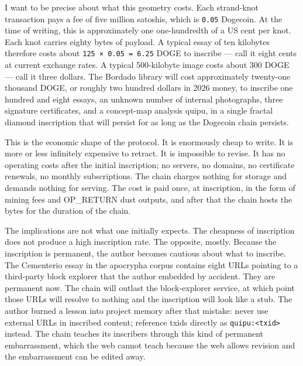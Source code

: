 \documentclass[11pt,openany]{book}
\begin{document}
I want to be precise about what this geometry costs. Each strand-knot transaction pays a fee of five million satoshis, which is \texttt{0.05} Dogecoin. At the time of writing, this is approximately one one-hundredth of a US cent per knot. Each knot carries eighty bytes of payload. A typical essay of ten kilobytes therefore costs about \texttt{125 × 0.05 = 6.25} DOGE to inscribe — call it eight cents at current exchange rates. A typical 500-kilobyte image costs about 300 DOGE — call it three dollars. The Bordado library will cost approximately twenty-one thousand DOGE, or roughly two hundred dollars in 2026 money, to inscribe one hundred and eight essays, an unknown number of internal photographs, three signature certificates, and a concept-map analysis quipu, in a single fractal diamond inscription that will persist for as long as the Dogecoin chain persists.

This is the economic shape of the protocol. It is enormously cheap to write. It is more or less infinitely expensive to retract. It is impossible to revise. It has no operating costs after the initial inscription; no servers, no domains, no certificate renewals, no monthly subscriptions. The chain charges nothing for storage and demands nothing for serving. The cost is paid once, at inscription, in the form of mining fees and OP\_RETURN dust outputs, and after that the chain hosts the bytes for the duration of the chain.

The implications are not what one initially expects. The cheapness of inscription does not produce a high inscription rate. The opposite, mostly. Because the inscription is permanent, the author becomes cautious about what to inscribe. The Cementerio essay in the apocrypha corpus contains eight URLs pointing to a third-party block explorer that the author embedded by accident. They are permanent now. The chain will outlast the block-explorer service, at which point those URLs will resolve to nothing and the inscription will look like a stub. The author burned a lesson into project memory after that mistake: never use external URLs in inscribed content; reference txids directly as \texttt{quipu:<txid>} instead. The chain teaches its inscribers through this kind of permanent embarrassment, which the web cannot teach because the web allows revision and the embarrassment can be edited away.
\end{document}
